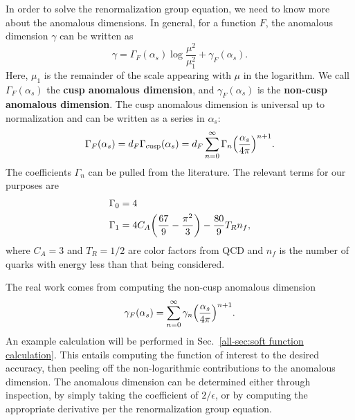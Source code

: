 \documentclass[../thesis.tex]{subfiles}
\providecommand{\cusp}{\mathrm{cusp}}
\begin{document}
	In order to solve the renormalization group equation, we need to know more about the anomalous dimensions. In general, for a function $F$, the anomalous dimension $\gamma$ can be written as \cite{frye_factorization_2016}
	\begin{equation}\label{all-eq:general anomalous dimension}
		\gamma = \Gamma_F(\alpha_s) \log\frac{\mu^2}{\mu_1^2} + \gamma_F(\alpha_s).
	\end{equation}
	Here, $\mu_1$ is the remainder of the scale appearing with $\mu$ in the logarithm. We call $\Gamma_F(\alpha_s)$ the \textbf{cusp anomalous dimension}, and $\gamma_F(\alpha_s)$ is the \textbf{non-cusp anomalous dimension}. The cusp anomalous dimension is universal up to normalization and can be written as a series in $\alpha_s$:
	\begin{equation}\label{all-eq:general cusp anomalous dimension}
		\Gamma_F(\alpha_s) = d_F \Gamma_\cusp(\alpha_s) = d_F \sum_{n = 0}^\infty \Gamma_n \qty(\frac{\alpha_s}{4\pi})^{n + 1}.
	\end{equation}
	The coefficients $\Gamma_n$ can be pulled from the literature. The relevant terms for our purposes are \cite{frye_factorization_2016}
	\begin{equation}\label{all-eq:Gamma values}
	\begin{aligned}
		\Gamma_0 &= 4 \\
		\Gamma_1 &= 4C_A \qty(\frac{67}{9} - \frac{\pi^2}{3}) - \frac{80}{9}T_R n_f,
	\end{aligned}
	\end{equation}
	where $C_A = 3$ and $T_R = 1/2$ are color factors from QCD and $n_f$ is the number of quarks with energy less than that being considered.

	The real work comes from computing the non-cusp anomalous dimension
	\begin{equation}\label{all-eq:general non-cusp anomalous dimension}
		\gamma_F(\alpha_s) = \sum_{n = 0}^\infty \gamma_n \qty(\frac{\alpha_s}{4\pi})^{n + 1}.
	\end{equation}
	An example calculation will be performed in Sec.~\ref{all-sec:soft function calculation}. This entails computing the function of interest to the desired accuracy, then peeling off the non-logarithmic contributions to the anomalous dimension. The anomalous dimension can be determined either through inspection, by simply taking the coefficient of $2/\epsilon$, or by computing the appropriate derivative per the renormalization group equation.
\end{document}
